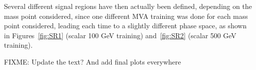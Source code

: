 \documentclass[a4paper, 10pt, openright]{report}
\begin{document}
Several different signal regions have then actually been defined, depending on the mass point considered, since one different \ac{MVA} training was done for each mass point considered, leading each time to a slightly different phase space, as shown in Figures~\ref{fig:SR1} (scalar 100 GeV training) and~\ref{fig:SR2} (scalar 500 GeV training).


\color{red}FIXME: Update the text? And add final plots everywhere \color{black}
\end{document}
